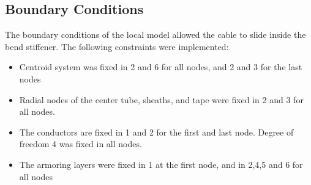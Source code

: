 \subsection{Boundary Conditions}
The boundary conditions of the local model allowed the cable to slide inside the bend stiffener. The following constraints were implemented:
\begin{itemize}
    \item Centroid system was fixed in 2 and 6 for all nodes, and 2 and 3 for the last nodes
    \item Radial nodes of the center tube, sheaths, and tape were fixed in 2 and 3 for all nodes. 
    \item The conductors are fixed in 1 and 2 for the first and last node. Degree of freedom 4 was fixed in all nodes.
    \item The armoring layers were fixed in 1 at the first node, and in 2,4,5 and 6 for all nodes
\end{itemize}

